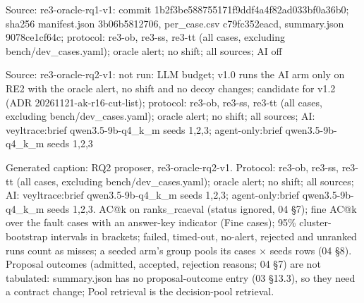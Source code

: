 \noindent Source: re3-oracle-rq1-v1: commit 1b2f3be588755171f9ddf4a4f82ad033bf0a36b0; sha256 manifest.json 3b06b5812706, per\_case.csv c79fc352eacd, summary.json 9078ce1cf64c; protocol: re3-ob, re3-ss, re3-tt (all cases, excluding bench/\allowbreak{}dev\_cases.yaml); oracle alert; no shift; all sources; AI off\par
\noindent Source: re3-oracle-rq2-v1: not run: LLM budget; v1.0 runs the AI arm only on RE2 with the oracle alert, no shift and no decoy changes; candidate for v1.2 (ADR 20261121-ak-r16-cut-list); protocol: re3-ob, re3-ss, re3-tt (all cases, excluding bench/\allowbreak{}dev\_cases.yaml); oracle alert; no shift; all sources; AI: veyltrace:brief qwen3.5-9b-q4\_k\_m seeds 1,2,3; agent-only:brief qwen3.5-9b-q4\_k\_m seeds 1,2,3\par
\noindent Generated caption: RQ2 proposer, re3-oracle-rq2-v1. Protocol: re3-ob, re3-ss, re3-tt (all cases, excluding bench/\allowbreak{}dev\_cases.yaml); oracle alert; no shift; all sources; AI: veyltrace:brief qwen3.5-9b-q4\_k\_m seeds 1,2,3; agent-only:brief qwen3.5-9b-q4\_k\_m seeds 1,2,3. AC@k on ranks\_rcaeval (status ignored, 04 \S{}7); fine AC@k over the fault cases with an answer-key indicator (Fine cases); 95\% cluster-bootstrap intervals in brackets; failed, timed-out, no-alert, rejected and unranked runs count as misses; a seeded arm's group pools its cases $\times$ seeds rows (04 \S{}8). Proposal outcomes (admitted, accepted, rejection reasons; 04 \S{}7) are not tabulated: summary.json has no proposal-outcome entry (03 \S{}13.3), so they need a contract change; Pool retrieval is the decision-pool retrieval.\par
\endgroup
